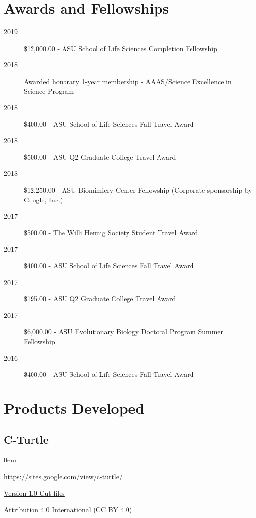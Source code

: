 \documentclass[12pt,a4paper]{article}
\begin{document}
\section*{Awards and Fellowships}
	\begin{description}
		\item [2019] \$12,000.00 - ASU School of Life Sciences Completion Fellowship
		\item [2018] Awarded honorary 1-year membership - AAAS/Science Excellence in Science Program
		\item [2018] \$400.00 - ASU School of Life Sciences Fall Travel Award
		\item [2018] \$500.00 - ASU Q2 Graduate College Travel Award
		\item [2018] \$12,250.00 - ASU Biomimicry Center Fellowship (Corporate sponsorship by Google, Inc.)
		\item [2017] \$500.00 - The Willi Hennig Society Student Travel Award
		\item [2017] \$400.00 - ASU School of Life Sciences Fall Travel Award
		\item [2017] \$195.00 - ASU Q2 Graduate College Travel Award
		\item [2017] \$6,000.00 - ASU Evolutionary Biology Doctoral Program Summer Fellowship
		\item [2016] \$400.00 - ASU School of Life Sciences Fall Travel Award
	\end{description}

\section*{Products Developed}
	\subsection*{C-Turtle}
		\begin{description}
			\itemsep0em
			\item[Website] \href{https://sites.google.com/view/c-turtle/}{https://sites.google.com/view/c-turtle/}
			\item[Design] \href{https://drive.google.com/file/d/0BxntR7XVPIVqekR3Sjcyd1hkUm8/view}{Version 1.0 Cut-files}
			\item[License] \href{https://creativecommons.org/licenses/by/4.0/}{Attribution 4.0 International} (CC BY 4.0)
		\end{description}
\end{document}
